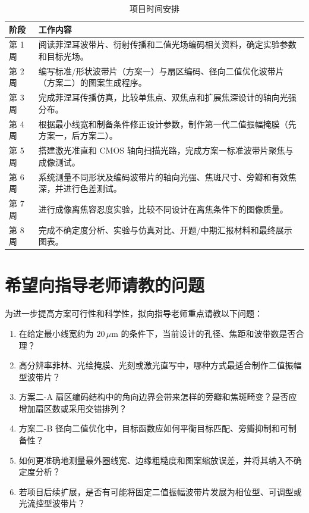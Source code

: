 \documentclass[UTF8,a4paper,11pt]{ctexart}
\begin{document}
\begin{table}[H]
\centering
\caption{项目时间安排}
\label{tab:schedule}
\begin{tabular}{p{2cm}p{11cm}}
\toprule
阶段 & 工作内容 \\
\midrule
第 1 周 & 阅读菲涅耳波带片、衍射传播和二值光场编码相关资料，确定实验参数和目标光场。 \\
第 2 周 & 编写标准/形状波带片（方案一）与扇区编码、径向二值优化波带片（方案二）的图案生成程序。 \\
第 3 周 & 完成菲涅耳传播仿真，比较单焦点、双焦点和扩展焦深设计的轴向光强分布。 \\
第 4 周 & 根据最小线宽和制备条件修正设计参数，制作第一代二值振幅掩膜（先方案一，后方案二）。 \\
第 5 周 & 搭建激光准直和 CMOS 轴向扫描光路，完成方案一标准波带片聚焦与成像测试。 \\
第 6 周 & 系统测量不同形状及编码波带片的轴向光强、焦斑尺寸、旁瓣和有效焦深，并进行色差测试。 \\
第 7 周 & 进行成像离焦容忍度实验，比较不同设计在离焦条件下的图像质量。 \\
第 8 周 & 完成不确定度分析、实验与仿真对比、开题/中期汇报材料和最终展示图表。 \\
\bottomrule
\end{tabular}
\end{table}

\section{希望向指导老师请教的问题}

为进一步提高方案可行性和科学性，拟向指导老师重点请教以下问题：

\begin{enumerate}[label=(\arabic*)]
\item 在给定最小线宽约为 $20\,\mu\mathrm{m}$ 的条件下，当前设计的孔径、焦距和波带数是否合理？
\item 高分辨率菲林、光绘掩膜、光刻或激光直写中，哪种方式最适合制作二值振幅型波带片？
\item 方案二-A 扇区编码结构中的角向边界会带来怎样的旁瓣和焦斑畸变？是否应增加扇区数或采用交错排列？
\item 方案二-B 径向二值优化中，目标函数应如何平衡目标匹配、旁瓣抑制和可制备性？
\item 如何更准确地测量最外圈线宽、边缘粗糙度和图案缩放误差，并将其纳入不确定度分析？
\item 若项目后续扩展，是否有可能将固定二值振幅波带片发展为相位型、可调型或光流控型波带片？
\end{enumerate}
\end{document}
